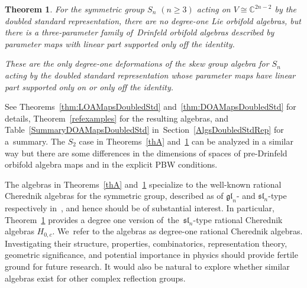 \documentclass[pdftex]{sigma}
\numberwithin{equation}{section}
\newtheorem{Theorem}{Theorem}[section]
\begin{document}
\begin{Theorem}\label{thB}For the symmetric group $S_n$ $(n\geq 3)$ acting on $V \cong \mathbb{C}^{2n-2}$ by the
doubled standard representation, there are no degree-one Lie orbifold algebras,
but there is a three-parameter family of~Drinfeld orbifold algebras described by
parameter maps with linear part supported only off the identity.

These are the only degree-one deformations of the skew group algebra for $S_n$
acting by the doubled standard representation whose
parameter maps have linear part supported only on or only off the identity.
\end{Theorem}
See Theorems~\ref{thm:LOAMapsDoubledStd} and~\ref{thm:DOAMapsDoubledStd}
for details, Theorem~\ref{refexamples} for the resulting algebras,
and Table~\ref{SummaryDOAMapsDoubledStd} in~Section~\ref{AlgsDoubledStdRep} for a~summary.
The $S_2$ case in Theorems~\ref{thA} and~\ref{thB} can be analyzed in a similar way but there are some
differences in the dimensions of spaces of pre-Drinfeld orbifold algebra maps and
in the explicit PBW conditions.

The algebras in Theorems~\ref{thA} and~\ref{thB} specialize
to the well-known rational Cherednik algebras for the symmetric group,
described as of $\mathfrak{gl}_n$- and $\mathfrak{sl}_n$-type respectively
in~\cite{GanGinzburg2006}, and hence should be of substantial interest.
In particular, Theorem~\ref{thB}
provides a degree one version of~the~$\mathfrak{sl}_n$-type rational Cherednik
algebras $H_{0,c}$. We~refer to the algebras as degree-one rational Cherednik algebras.
Investigating their structure, properties, combinatorics, representation theory,
geometric significance, and potential importance in physics
should provide fertile ground for future research. It would also be natural
to explore whether similar algebras exist for other complex reflection groups.
\end{document}
